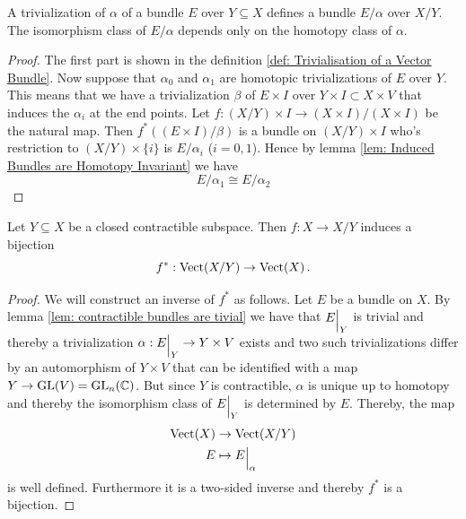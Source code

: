 \begin{lemma}
	A trivialization of $\alpha$ of a bundle $E$ over $Y\subseteq X$ defines a bundle $E\slash \alpha$ over $X\slash Y$. The isomorphism class of $E\slash \alpha$ depends only on the homotopy class of $\alpha$. 
\end{lemma}
\begin{proof}
	The first part is shown in the definition \ref{def: Trivialisation of a Vector Bundle}. Now suppose that $\alpha_0$ and $\alpha_1$ are homotopic trivializations of $E$ over $Y$. This means that we have a trivialization $\beta$ of $E \times I$ over $Y \times I\subset X \times V$ that induces the $\alpha_i$ at the end points. Let $f: (X \slash Y)\times I\to (X\times I)\slash(X\times I)$ be the natural map. Then $f^*((E \times I)\slash \beta)$ is a bundle on $(X\slash Y)\times I$ who's restriction to $(X\slash Y)\times \{i\}$ is $E\slash \alpha_i$ ($i=0,1$). Hence by lemma \ref{lem: Induced Bundles are Homotopy Invariant} we have 
	\begin{equation*}
		E\slash \alpha_1 \cong E\slash \alpha _2
	\end{equation*}
\end{proof}
\begin{lemma}
	Let $Y\subseteq X$ be a closed contractible subspace. Then $f: X \to X\slash Y$ induces a bijection 
	\begin{equation*}
		f^*:\operatorname{\mathrm{Vect}}(X\slash Y)\to \operatorname{\mathrm{Vect}}(X) \, .
	\end{equation*}
\end{lemma}
\begin{proof}
	We will construct an inverse of $f^*$ as follows. Let $E$ be a bundle on $X$. By lemma \ref{lem: contractible bundles are tivial} we have that ${E}\einsch{Y}$ is trivial and thereby a trivialization $\alpha: {E}\einsch{Y}\to Y\times V$ exists and two such trivializations differ by an automorphism of $Y\times V$ that can be identified with a map $Y\to \mathrm{GL}(V)=\mathrm{GL}_n(\mathbb{C})$. But since $Y$ is contractible, $\alpha$ is unique up to homotopy and thereby the isomorphism class of ${E}\einsch{Y}$ is determined by $E$. Thereby, the map 
	\begin{align*}
		\vect(X)&\to \vect(X\slash Y) \\
		E&\mapsto {E}\einsch{\alpha}
	\end{align*} is well defined. Furthermore it is a two-sided inverse and thereby $f^*$ is a bijection.
\end{proof}
